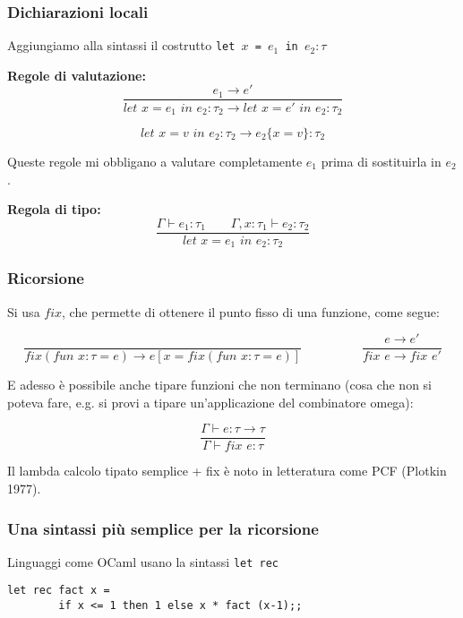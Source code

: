 \documentclass[a4paper,10pt]{article}
\begin{document}
   \subsubsection{Dichiarazioni locali}
   Aggiungiamo alla sintassi il costrutto \texttt{let $x$ = $e_1$ in $e_2 : \tau$}\smallskip
   
   \textbf{Regole di valutazione:}
   \[ \dfrac{e_1 \to e'}{let\,\, x = e_1 \,\,in\,\, e_2 :\tau_2 \to  let\,\, x = e' \,\,in\,\, e_2 :\tau_2} \]
   
   \[let\,\,x = v \,\, in \,\, e_2 : \tau_2 \to e_2\{ x = v \}: \tau_2\]
   
   Queste regole mi obbligano a valutare completamente $e_1$ prima di sostituirla in $e_2$.
   
   \textbf{Regola di tipo:}
   \[ \dfrac{\Gamma \vdash e_1 : \tau_1 \quad\quad \Gamma, x:\tau_1 \vdash e_2:\tau_2}{let\,\, x = e_1\,\,in\,\, e_2 : \tau_2} \]
   
   \subsubsection{Ricorsione}
   Si usa $fix$, che permette di ottenere il punto fisso di una funzione, come segue:
   
   \[ \dfrac{}{fix(fun\,\, x : \tau = e) \to e[x = fix(fun\,\, x : \tau = e)]} \hspace{2cm} \dfrac{e \to e'}{fix\,\,e\to fix\,\,e'}\]
   
   E adesso è possibile anche tipare funzioni che non terminano (cosa che non si poteva fare, e.g. si provi a tipare un'applicazione del combinatore omega):
   
   \[ \dfrac{\Gamma \vdash e : \tau\to \tau}{\Gamma \vdash fix\,\, e:\tau}\]
   
   Il lambda calcolo tipato semplice + fix è noto in letteratura come PCF (Plotkin 1977).
   
   \subsubsection{Una sintassi più semplice per la ricorsione}
   
   Linguaggi come OCaml usano la sintassi \texttt{let rec}
   
   \begin{lstlisting}
let rec fact x = 
        if x <= 1 then 1 else x * fact (x-1);;   \end{lstlisting}
\end{document}
